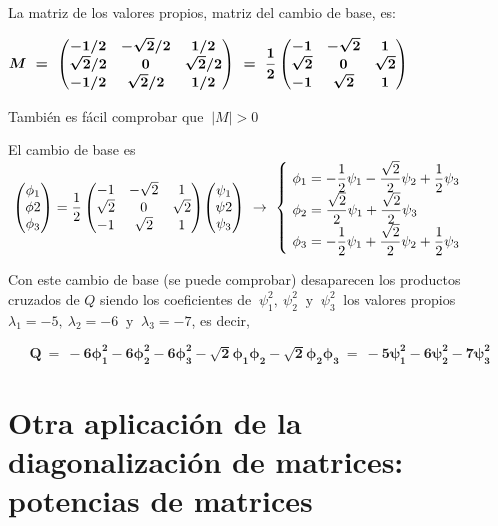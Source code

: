 La matriz de los valores propios, matriz del cambio de base, es:

$\boldsymbol{M \ = \ 
\mqty(
-1/2 & -\sqrt{2}/2 & 1/2 \\
\sqrt{2}/2 & 0 & \sqrt{2}/2 \\
-1/2 & \sqrt{2}/2 & 1/2
)
\ = \ \dfrac 1 2 \, \mqty( -1&-\sqrt 2 & 1 \\ \sqrt 2 & 0 & \sqrt 2 \\ -1 & \sqrt 2 & 1 ) }$

También es fácil comprobar que $\ |M|>0$

El cambio de base es $\ \mqty(\phi_1\\ \phi2 \\ \phi_3)= \dfrac 1 2 \, \mqty( -1&-\sqrt 2 & 1 \\ \sqrt 2 & 0 & \sqrt 2 \\ -1 & \sqrt 2 & 1 ) \mqty(\psi_1\\ \psi2 \\ \psi_3) \ \to \ \begin{cases} \ \phi_1=-\dfrac 1 2 \psi_1 - \dfrac{\sqrt{2}}{2} \psi_2 + \dfrac 1 2 \psi_3 \\ \ \phi_2=\dfrac{\sqrt{2}}{2} \psi_1+\dfrac{\sqrt{2}}{2}\psi_3 \\ \ \phi_3= -\dfrac 1 2 \psi_1 + \dfrac{\sqrt{2}}{2} \psi_2+\dfrac 1 2 \psi_3 \end{cases}$

Con este cambio de base (se puede comprobar) desaparecen los productos cruzados de $Q$ siendo los coeficientes de $\ \psi_1^2,\ \psi_2^2 \ \text{ y } \ \psi_3^2 \ $ los valores propios $\lambda_1=-5,\ \lambda_2=-6 \ \text{ y } \ \lambda_3=-7$, es decir,

$$\boldsymbol{ Q \ = \ -6\phi_1^2-6\phi_2^2-6\phi_3^2-\sqrt{2}\phi_1\phi_2	-\sqrt{2}\phi_2\phi_3 \ = \ -5\psi_1^2-6\psi_2^2-7\psi_3^2}$$


\color{black}
\vspace{15mm}
\section{Otra aplicación de la diagonalización de matrices: potencias de matrices}

